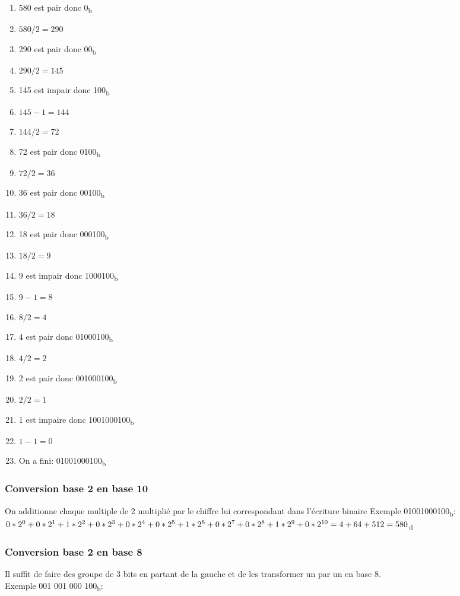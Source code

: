 \documentclass[10pt,a4paper]{article}
\begin{document}
 \begin{enumerate}
	 \item 580 est pair donc 0\textsubscript{b}
	 \item $580/2 = 290$
	 \item 290 est pair donc 00\textsubscript{b}
	 \item $290/2 = 145$
	 \item 145 est impair donc 100\textsubscript{b}
	 \item $145-1 = 144$
	 \item $144/2 = 72$
	 \item 72 est pair donc  0100\textsubscript{b}
	 \item $72/2 = 36$
	 \item 36 est pair donc 00100\textsubscript{b}
	 \item $36/2 = 18$
	 \item 18 est pair donc 000100\textsubscript{b}
	 \item $18/2 = 9$
	 \item 9 est impair donc 1000100\textsubscript{b}
	 \item $9-1 = 8$
	 \item $8/2 = 4$
	 \item 4 est pair donc 01000100\textsubscript{b}
	 \item $4/2 = 2$
	 \item 2 est pair donc 001000100\textsubscript{b}
	 \item $2/2 = 1$
	 \item 1 est impaire donc 1001000100\textsubscript{b}
	 \item $1-1 = 0$
	 \item On a fini: 01001000100\textsubscript{b}
 \end{enumerate}

 \subsubsection{Conversion base 2 en base 10}
 On additionne chaque multiple de 2 multiplié par le chiffre lui correspondant dans l'écriture binaire
 Exemple 01001000100\textsubscript{b}:\\
 $0*2^0 + 0*2^1 + 1*2^2 + 0*2^3 +0*2^4 +0*2^5 + 1*2^6 + 0*2^7 +0*2^8 + 1*2^9 + 0*2^{10} \\= 4 + 64 + 512 = 580$\textsubscript{d}


 \subsubsection{Conversion base 2 en base 8}
 Il suffit de faire des groupe de 3 bits en partant de la gauche et de les transformer un par un en base 8.\\
 Exemple 001 001 000 100\textsubscript{b}:
\end{document}
